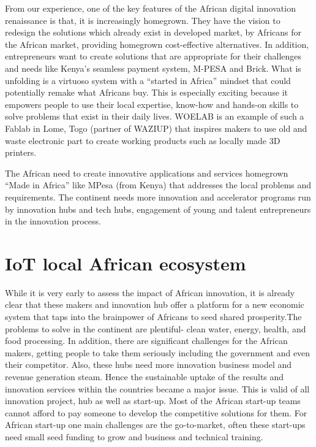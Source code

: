 \documentclass{llncs}
\begin{document}
From our experience, one of the key features of the African digital innovation renaissance is that, it is increasingly homegrown.
They have the vision to redesign the solutions which already exist in developed market, by Africans for the African market, providing homegrown cost-effective alternatives.
In addition, entrepreneurs want to create solutions that are appropriate for their challenges and needs like Kenya’s seamless payment system, M-PESA and Brick.
What is unfolding is a virtuoso system with a “started in Africa” mindset that could potentially remake what Africans buy.
This is especially exciting because it empowers people to use their local expertise, know-how and hands-on skills to solve problems that exist in their daily lives.
WOELAB is an example of such a Fablab in Lome, Togo (partner of WAZIUP) that inspires makers to use old and waste electronic part to create working products such as locally made 3D printers.

The African need to create innovative applications and services homegrown “Made in Africa” like MPesa (from Kenya) that addresses the local problems and requirements.
The continent needs more innovation and accelerator programs run by innovation hubs and tech hubs, engagement of young and talent entrepreneurs in the innovation process.

\section{IoT local African ecosystem}
While it is very early to assess the impact of African innovation, it is already clear that these makers and innovation hub offer a platform for a new economic system that taps into the brainpower of Africans to seed shared prosperity.The problems to solve in the continent are plentiful- clean water, energy, health, and food processing. In addition, there are significant challenges for the African makers, getting people to take them seriously including the government and even their competitor. Also, these hubs need more innovation business model and revenue generation steam. Hence the sustainable uptake of the results and innovation services within the countries became a major issue. This is valid of all innovation project, hub as well as start-up.
Most of the African start-up teams cannot afford to pay someone to develop the competitive solutions for them.
For African start-up one main challenges are the go-to-market, often these start-ups need small seed funding to grow and business and technical training.
\end{document}

